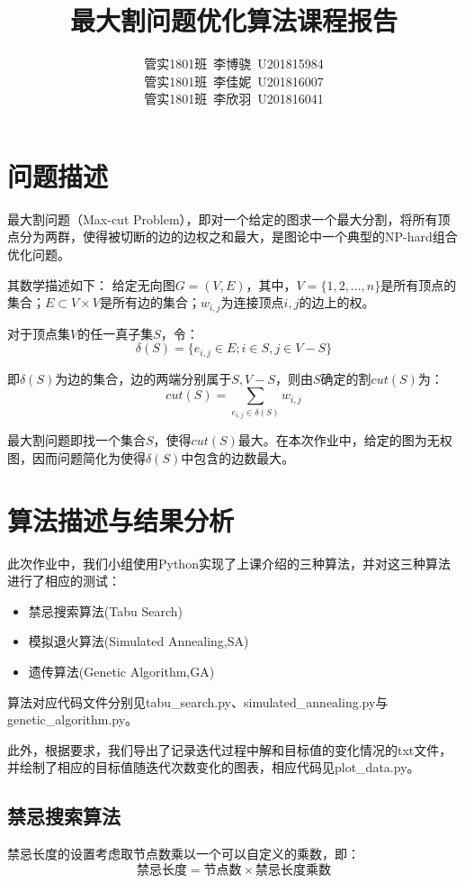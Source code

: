 \documentclass{article}
\title{最大割问题优化算法课程报告}
\author{管实1801班~李博骁~U201815984\\管实1801班~李佳妮~U201816007\\管实1801班~李欣羽~U201816041}
\begin{document}
    \maketitle
    \newpage
    \tableofcontents
    \newpage

    \section{问题描述}
    最大割问题（Max-cut Problem），即对一个给定的图求一个最大分割，将所有顶点分为两群，使得被切断的边的边权之和最大，是图论中一个典型的NP-hard组合优化问题。

    其数学描述如下：
    给定无向图$G=(V,E)$，其中，$V=\{1,2,\dots,n\}$是所有顶点的集合；$E\subset V \times V$是所有边的集合；$w_{i,j}$为连接顶点$i,j$的边上的权。

    对于顶点集$V$的任一真子集$S$，令：
    \begin{equation}
        \delta(S)=\{e_{i,j}\in E;i\in S,j\in V-S\}
    \end{equation}

    即$\delta(S)$为边的集合，边的两端分别属于$S,V-S$，则由$S$确定的割$cut(S)$为：
    \begin{equation}
        cut(S)=\sum_{e_{i,j}\in \delta(S)} w_{i,j}
    \end{equation}

    最大割问题即找一个集合$S$，使得$cut(S)$最大。在本次作业中，给定的图为无权图，因而问题简化为使得$\delta(S)$中包含的边数最大。

    \section{算法描述与结果分析}
    此次作业中，我们小组使用Python实现了上课介绍的三种算法，并对这三种算法进行了相应的测试：
    \begin{itemize}
        \item 禁忌搜索算法(Tabu Search)
        \item 模拟退火算法(Simulated Annealing,SA)
        \item 遗传算法(Genetic Algorithm,GA)
    \end{itemize}
    
    算法对应代码文件分别见tabu\_search.py、simulated\_annealing.py与genetic\_algorithm.py。

    此外，根据要求，我们导出了记录迭代过程中解和目标值的变化情况的txt文件，并绘制了相应的目标值随迭代次数变化的图表，相应代码见plot\_data.py。

    \subsection{禁忌搜索算法}
    禁忌长度的设置考虑取节点数乘以一个可以自定义的乘数，即：
    \begin{equation}
        \mbox{禁忌长度} = \mbox{节点数} \times \mbox{禁忌长度乘数}
    \end{equation}
\end{document}
